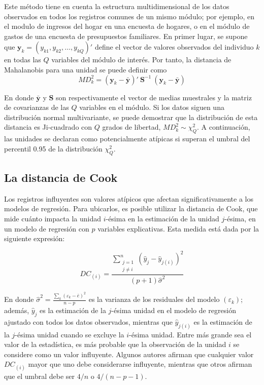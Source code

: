 \documentclass[
  12pt,
  spanish,
]{book}
\begin{document}
Este método tiene en cuenta la estructura multidimensional de los datos observados en todos los registros comunes de un mismo módulo; por ejemplo, en el modulo de ingresos del hogar en una encuesta de hogares, o en el módulo de gastos de una encuesta de presupuestos familiares. En primer lugar, se supone que \(\mathbf{y}_k = (y_{k1}, y_{k2}, \ldots, y_{kQ} )'\) define el vector de valores observados del individuo \(k\) en todas las \(Q\) variables del módulo de interés. Por tanto, la distancia de Mahalanobis para una unidad se puede definir como
\[
MD_k^2=(\mathbf{y}_k-\bar{\mathbf{y}})' \ \mathbf{S}^{-1} \ (\mathbf{y}_k-\bar{\mathbf{y}})
\]

En donde \(\bar{\mathbf{y}}\) y \(\mathbf{S}\) son respectivamente el vector de medias muestrales y la matriz de covarianzas de las \(Q\) variables en el módulo. Si los datos siguen una distribución normal multivariante, se puede demostrar que la distribución de esta distancia es Ji-cuadrado con \(Q\) grados de libertad, \(MD_k^2 \sim \chi_Q^2\). A continuación, las unidades se declaran como potencialmente atípicas si superan el umbral del percentil 0.95 de la distribución \(\chi_{Q}^2\).

\hypertarget{la-distancia-de-cook}{%
\subsection{La distancia de Cook}\label{la-distancia-de-cook}}

Los registros influyentes son valores atípicos que afectan significativamente a los modelos de regresión. Para ubicarlos, es posible utilizar la distancia de Cook, que mide cuánto impacta la unidad \(i\)-ésima en la estimación de la unidad \(j\)-ésima, en un modelo de regresión con \(p\) variables explicativas. Esta medida está dada por la siguiente expresión:

\[
DC_{(i)} = \dfrac{\sum_{\substack{j=1\\ j\neq i}}^{n}(\hat y_j- \hat y_{j(i)})^2}{(p+1) \hat{\sigma}^2} 
\]

En donde \(\hat{\sigma}^2 = \frac{\sum_k (\varepsilon_k - \bar{e})^2}{n-p}\) es la varianza de los residuales del modelo \((\varepsilon_k)\); además, \(\hat y_j\) es la estimación de la \(j\)-ésima unidad en el modelo de regresión ajustado con todos los datos observados, mientras que \(\hat y_{j(i)}\) es la estimación de la \(j\)-ésima unidad cuando se excluye la \(i\)-ésima unidad. Entre más grande sea el valor de la estadística, es más probable que la observación de la unidad \(i\) se considere como un valor influyente. Algunos autores afirman que cualquier valor \(DC_{(i)}\) mayor que uno debe considerarse influyente, mientras que otros afirman que el umbral debe ser \(4/n\) o \(4/(n-p-1)\).
\end{document}
